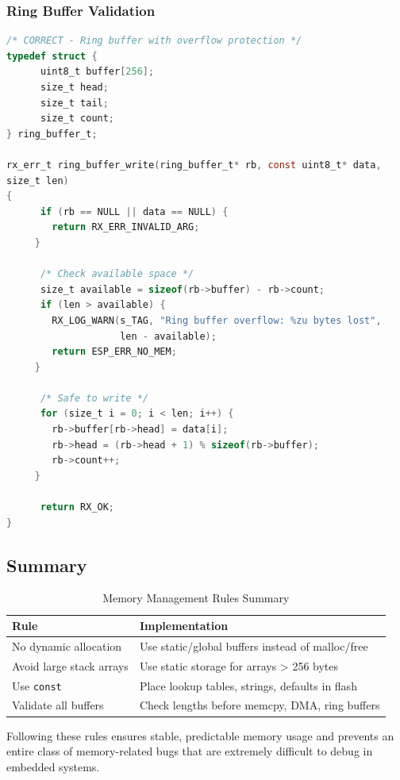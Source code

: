 \subsubsection{Ring Buffer Validation}

\begin{lstlisting}[language=C]
/* CORRECT - Ring buffer with overflow protection */
typedef struct {
      uint8_t buffer[256];
      size_t head;
      size_t tail;
      size_t count;
} ring_buffer_t;

rx_err_t ring_buffer_write(ring_buffer_t* rb, const uint8_t* data,
size_t len)
{
      if (rb == NULL || data == NULL) {
        return RX_ERR_INVALID_ARG;
     }

      /* Check available space */
      size_t available = sizeof(rb->buffer) - rb->count;
      if (len > available) {
        RX_LOG_WARN(s_TAG, "Ring buffer overflow: %zu bytes lost",
                    len - available);
        return ESP_ERR_NO_MEM;
     }

      /* Safe to write */
      for (size_t i = 0; i < len; i++) {
        rb->buffer[rb->head] = data[i];
        rb->head = (rb->head + 1) % sizeof(rb->buffer);
        rb->count++;
     }

      return RX_OK;
}


\end{lstlisting}
\subsection{Summary}

\begin{table}[H]
\centering
\caption{Memory Management Rules Summary}
\label{tab:memory-rules-summary}
\begin{tabular}{
      | l | p{9cm} |}
\hline
\textbf{Rule} & \textbf{Implementation} \\
\hline
No dynamic allocation & Use static/global buffers instead of malloc/free \\
\hline
Avoid large stack arrays & Use static storage for arrays > 256 bytes \\
\hline
Use \texttt{const} & Place lookup tables, strings, defaults in flash \\
\hline
Validate all buffers & Check lengths before memcpy, DMA, ring buffers \\
\hline
\end{tabular}
\end{table}

Following these rules ensures stable, predictable memory usage and prevents an entire class of memory-related bugs that are extremely difficult to debug in embedded systems.


